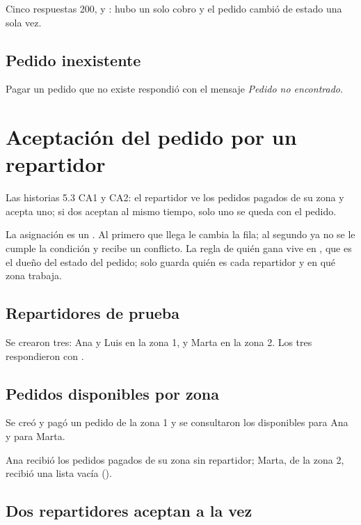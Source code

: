 \documentclass[11pt]{article}
\begin{document}
\observado Cinco respuestas 200,  y : hubo un solo cobro y el pedido
cambió de estado una sola vez.


\subsection{Pedido inexistente}
Pagar un pedido que no existe respondió  con el mensaje \emph{Pedido no encontrado}.

\section{Aceptación del pedido por un repartidor}\label{sec:aceptar}

\queria Las historias 5.3 CA1 y CA2: el repartidor ve los pedidos pagados de su zona y acepta uno; si
dos aceptan al mismo tiempo, solo uno se queda con el pedido.

\comofunciona La asignación es un
. Al primero que llega le cambia
la fila; al segundo ya no se le cumple la condición y recibe un conflicto. La regla de quién gana
vive en , que es el dueño del estado del pedido;  solo guarda quién es
cada repartidor y en qué zona trabaja.

\subsection{Repartidores de prueba}
Se crearon tres: Ana y Luis en la zona 1, y Marta en la zona 2. Los tres respondieron  con
.

\subsection{Pedidos disponibles por zona}
Se creó y pagó un pedido de la zona 1 y se consultaron los disponibles para Ana y para Marta.

\observado Ana recibió los pedidos pagados de su zona sin repartidor; Marta, de la zona 2, recibió
una lista vacía (\cod{[]}).

\subsection{Dos repartidores aceptan a la vez}
\end{document}
